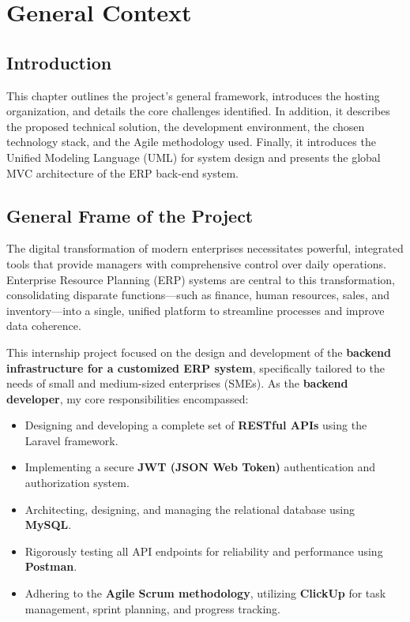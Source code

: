 \chapter{General Context}
\minitoc %
\section*{Introduction}
This chapter outlines the project's general framework, introduces the hosting organization, and details the core challenges identified. In addition, it describes the proposed technical solution, the development environment, the chosen technology stack, and the Agile methodology used. Finally, it introduces the Unified Modeling Language (UML) for system design and presents the global MVC architecture of the ERP back-end system.

\section{General Frame of the Project}
The digital transformation of modern enterprises necessitates powerful, integrated tools that provide managers with comprehensive control over daily operations. Enterprise Resource Planning (ERP) systems are central to this transformation, consolidating disparate functions—such as finance, human resources, sales, and inventory—into a single, unified platform to streamline processes and improve data coherence.

This internship project focused on the design and development of the \textbf{backend infrastructure for a customized ERP system}, specifically tailored to the needs of small and medium-sized enterprises (SMEs). As the \textbf{backend developer}, my core responsibilities encompassed:
\begin{itemize}
    \item Designing and developing a complete set of \textbf{RESTful APIs} using the Laravel framework.
    \item Implementing a secure \textbf{JWT (JSON Web Token)} authentication and authorization system.
    \item Architecting, designing, and managing the relational database using \textbf{MySQL}.
    \item Rigorously testing all API endpoints for reliability and performance using \textbf{Postman}.
    \item Adhering to the \textbf{Agile Scrum methodology}, utilizing \textbf{ClickUp} for task management, sprint planning, and progress tracking.
\end{itemize}

